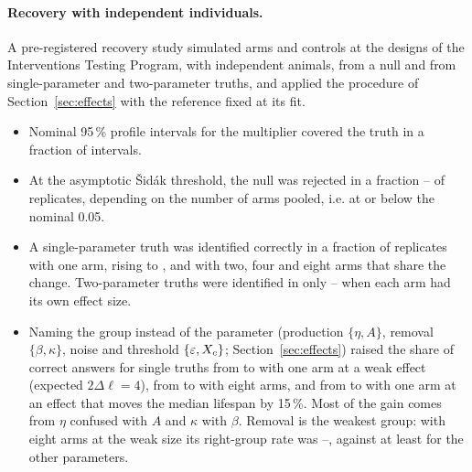 \paragraph{Recovery with independent individuals.} A pre-registered recovery study simulated arms and controls at the
designs of the Interventions Testing Program, with independent animals, from a null and from single-parameter and
two-parameter truths, and applied the procedure of Section~\ref{sec:effects} with the reference fixed at its fit.
\begin{itemize}[leftmargin=1.5em,itemsep=1pt]
  \item Nominal 95\,\% profile intervals for the multiplier covered the truth in a fraction  of
     intervals.
  \item At the asymptotic Šidák threshold, the null was rejected in a fraction -- of
    replicates, depending on the number of arms pooled, i.e. at or below the nominal 0.05.
  \item A single-parameter truth was identified correctly in a fraction  of replicates with one
    arm, rising to ,  and  with two, four and eight
    arms that share the change. Two-parameter truths were identified in only --
    when each arm had its own effect size.
  \item Naming the group instead of the parameter (production $\{\eta,A\}$, removal $\{\beta,\kappa\}$, noise and
    threshold $\{\varepsilon,X_c\}$; Section~\ref{sec:effects}) raised the share of correct answers for single truths from
     to  with one arm at a weak effect (expected $2\Delta\ell=4$), from
     to  with eight arms, and from  to  with
    one arm at an effect that moves the median lifespan by 15\,\%. Most of the gain comes from $\eta$ confused with $A$
    and $\kappa$ with $\beta$. Removal is the weakest group: with eight arms at the weak size its right-group rate was
    --, against at least  for the other
    parameters.
\end{itemize}

